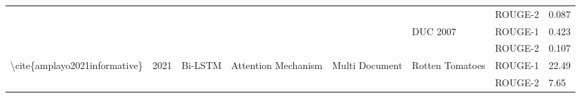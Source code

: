 \begin{table}[]
\begin{tabular}{|c|c|c|c|c|c|cc|}
    \multicolumn{1}{|l|}{}                                                                & \multicolumn{1}{l|}{}                      & \multicolumn{1}{l|}{}                             & \multicolumn{1}{l|}{}                                     & \multicolumn{1}{l|}{}                                                                                                  & \multicolumn{1}{l|}{}                                 & \multicolumn{1}{l|}{ROUGE-2}                                                                                                       & \multicolumn{1}{l|}{0.087} \\ \cline{6-8} 
    \multicolumn{1}{|l|}{}                                                                & \multicolumn{1}{l|}{}                      & \multicolumn{1}{l|}{}                             & \multicolumn{1}{l|}{}                                     & \multicolumn{1}{l|}{}                                                                                                  & \multicolumn{1}{l|}{\multirow{2}{*}{DUC 2007}}        & \multicolumn{1}{l|}{ROUGE-1}                                                                                                       & \multicolumn{1}{l|}{0.423} \\ \cline{7-8} 
    \multicolumn{1}{|l|}{}                                                                & \multicolumn{1}{l|}{}                      & \multicolumn{1}{l|}{}                             & \multicolumn{1}{l|}{}                                     & \multicolumn{1}{l|}{}                                                                                                  & \multicolumn{1}{l|}{}                                 & \multicolumn{1}{l|}{ROUGE-2}                                                                                                       & \multicolumn{1}{l|}{0.107} \\ \hline
    \multicolumn{1}{|l|}{\multirow{3}{*}{\textbackslash{}cite\{amplayo2021informative\}}} & \multicolumn{1}{l|}{\multirow{3}{*}{2021}} & \multicolumn{1}{l|}{\multirow{3}{*}{Bi-LSTM}}     & \multicolumn{1}{l|}{\multirow{3}{*}{Attention Mechanism}} & \multicolumn{1}{l|}{\multirow{3}{*}{Multi Document}}                                                                   & \multicolumn{1}{l|}{\multirow{3}{*}{Rotten Tomatoes}} & \multicolumn{1}{l|}{ROUGE-1}                                                                                                       & \multicolumn{1}{l|}{22.49} \\ \cline{7-8} 
    \multicolumn{1}{|l|}{}                                                                & \multicolumn{1}{l|}{}                      & \multicolumn{1}{l|}{}                             & \multicolumn{1}{l|}{}                                     & \multicolumn{1}{l|}{}                                                                                                  & \multicolumn{1}{l|}{}                                 & \multicolumn{1}{l|}{ROUGE-2}                                                                                                       & \multicolumn{1}{l|}{7.65}  \\ \cline{7-8} 

\end{tabular}
\end{table}
